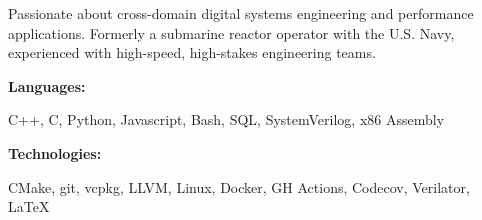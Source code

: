 \documentclass[9pt]{developercv} %
\begin{document}
\begin{minipage}[t]{0.46\textwidth}
	\vspace{-6pt}

	Passionate about cross-domain digital systems engineering and performance
	applications. Formerly a submarine reactor operator with the U.S. Navy,
	experienced with high-speed, high-stakes engineering teams.
\end{minipage}
\hfill %
\begin{minipage}[t]{0.465\textwidth}
	\vspace{-6pt}

	\begin{minipage}[t]{0.2\textwidth}
		\textbf{Languages:}
	\end{minipage}
	\hfill
	\begin{minipage}[t]{0.73\textwidth}
		C++, C, Python, Javascript, Bash, SQL, SystemVerilog, x86 Assembly
	\end{minipage}
	\vspace{4mm}

	\begin{minipage}[t]{0.2\textwidth}
		\textbf{Technologies:}
	\end{minipage}
	\hfill
	\begin{minipage}[t]{0.73\textwidth}
		CMake, git, vcpkg, LLVM, Linux, Docker, GH Actions, Codecov, Verilator, LaTeX
	\end{minipage}

\end{minipage}
\end{document}
